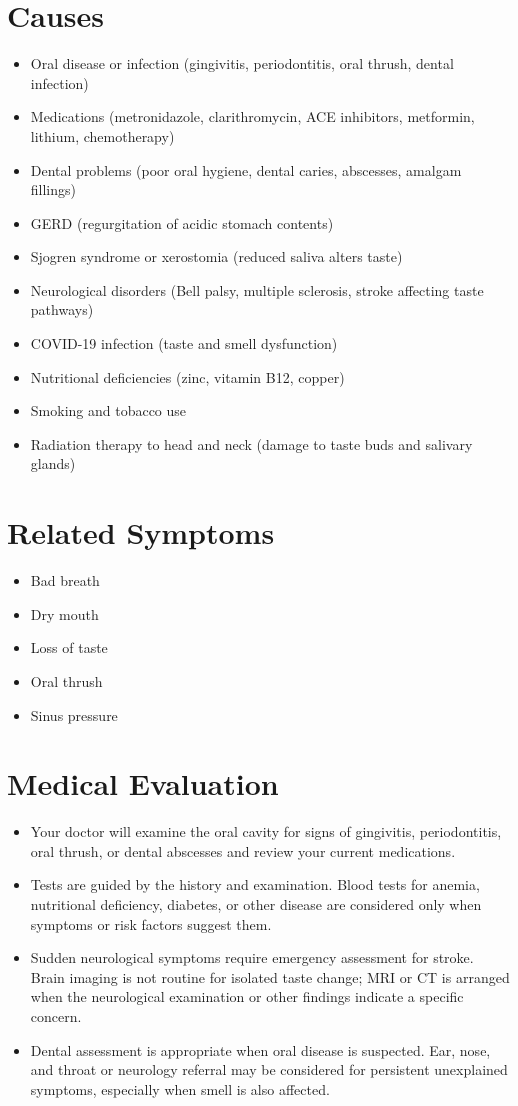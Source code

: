 \section*{Causes}
\begin{itemize}
 \item Oral disease or infection (gingivitis, periodontitis, oral thrush, dental infection)
 \item Medications (metronidazole, clarithromycin, ACE inhibitors, metformin, lithium, chemotherapy)
 \item Dental problems (poor oral hygiene, dental caries, abscesses, amalgam fillings)
 \item GERD (regurgitation of acidic stomach contents)
 \item Sjogren syndrome or xerostomia (reduced saliva alters taste)
 \item Neurological disorders (Bell palsy, multiple sclerosis, stroke affecting taste pathways)
 \item COVID-19 infection (taste and smell dysfunction)
 \item Nutritional deficiencies (zinc, vitamin B12, copper)
 \item Smoking and tobacco use
 \item Radiation therapy to head and neck (damage to taste buds and salivary glands)
\end{itemize}

\section*{Related Symptoms}
\begin{itemize}
 \item Bad breath
 \item Dry mouth
 \item Loss of taste
 \item Oral thrush
 \item Sinus pressure
\end{itemize}

\section*{Medical Evaluation}
\begin{itemize}
 \item Your doctor will examine the oral cavity for signs of gingivitis, periodontitis, oral thrush, or dental abscesses and review your current medications.
 \item Tests are guided by the history and examination. Blood tests for anemia, nutritional deficiency, diabetes, or other disease are considered only when symptoms or risk factors suggest them.
 \item Sudden neurological symptoms require emergency assessment for stroke. Brain imaging is not routine for isolated taste change; MRI or CT is arranged when the neurological examination or other findings indicate a specific concern.
 \item Dental assessment is appropriate when oral disease is suspected. Ear, nose, and throat or neurology referral may be considered for persistent unexplained symptoms, especially when smell is also affected.
\end{itemize}


